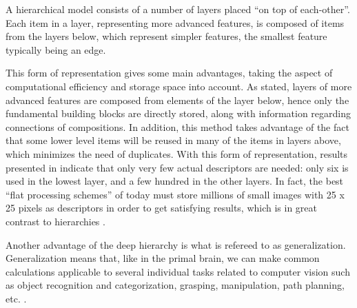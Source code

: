 A hierarchical model consists of a number of layers placed “on top of each-other”.
Each item in a layer, representing more advanced features,
is composed of items from the layers below, which represent simpler features,
the smallest feature typically being an edge.

This form of representation gives some main advantages,
taking the aspect of computational efficiency and storage space into account.
As stated, layers of more advanced features are composed from elements of the layer below,
hence only the fundamental building blocks are directly stored,
along with information regarding connections of compositions.
In addition, this method takes advantage of the fact that some lower level items
will be reused in many of the items in layers above, which minimizes the need of duplicates.
With this form of representation, results presented in \citet{fidler2009learning} indicate that
only very few actual descriptors are needed: only six is used in the lowest layer,
and a few hundred in the other layers.
In fact, the best “flat processing schemes” of today must store millions of small images
with 25 x 25 pixels as descriptors in order to get satisfying results,
which is in great contrast to hierarchies \citep{fidler2009learning}.

Another advantage of the deep hierarchy is what is refereed to as generalization.
Generalization means that, like in the primal brain,
we can make common calculations applicable to several individual tasks
related to computer vision such as object recognition and categorization,
grasping, manipulation, path planning, etc. \citep{kruger2013deep}.

